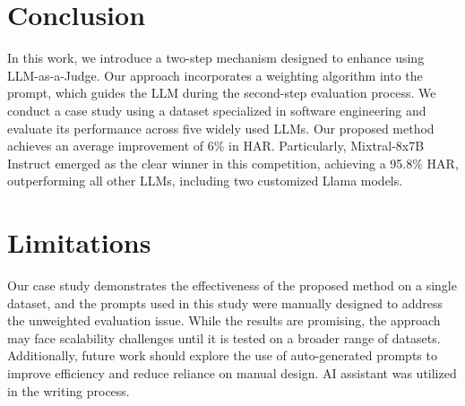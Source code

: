


\section{Conclusion }\label{sec:conclusion}


In this work, we introduce a two-step mechanism designed to enhance using LLM-as-a-Judge. Our approach incorporates a weighting algorithm into the prompt, which guides the LLM during the second-step evaluation process.  We conduct a case study using a dataset specialized in software engineering and evaluate its performance across five widely used LLMs. Our proposed method achieves an average improvement of 6\% in HAR. Particularly, Mixtral-8x7B Instruct emerged as the clear winner in this competition, achieving a 95.8\% HAR, outperforming all other LLMs, including two customized Llama models.




\section{Limitations}

Our case study demonstrates the effectiveness of the proposed method on a single dataset, and the prompts used in this study were manually designed to address the unweighted evaluation issue. While the results are promising, the approach may face scalability challenges until it is tested on a broader range of datasets. Additionally, future work should explore the use of auto-generated prompts to improve efficiency and reduce reliance on manual design. AI assistant was utilized in the writing process.

